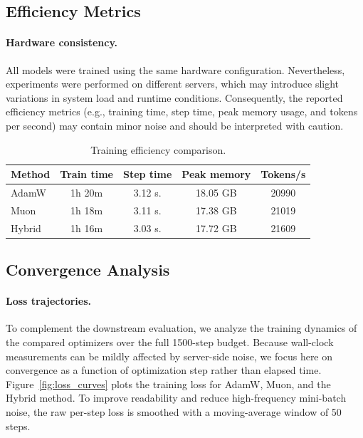 \documentclass[11pt,a4paper]{article}
\begin{document}
\subsection{Efficiency Metrics}

\paragraph{Hardware consistency.}
All models were trained using the same hardware configuration.
Nevertheless, experiments were performed on different servers, which may
introduce slight variations in system load and runtime conditions.
Consequently, the reported efficiency metrics (e.g., training time, step time,
peak memory usage, and tokens per second) may contain minor noise and should
be interpreted with caution.

\begin{table}[H]
	\centering
	\caption{Training efficiency comparison.}
	\begin{tabular}{lcccc}
		\toprule
		\textbf{Method} & \textbf{Train time} & \textbf{Step time} & \textbf{Peak memory} & \textbf{Tokens/s} \\
		\midrule
		AdamW           & 1h 20m              & 3.12 s.            & 18.05 GB             & 20990             \\
		Muon            & 1h 18m              & 3.11 s.            & 17.38 GB             & 21019             \\
		Hybrid          & 1h 16m              & 3.03 s.            & 17.72 GB             & 21609             \\
		\bottomrule
	\end{tabular}
\end{table}

\subsection{Convergence Analysis}

\paragraph{Loss trajectories.}
To complement the downstream evaluation, we analyze the training dynamics of
the compared optimizers over the full 1500-step budget. Because wall-clock
measurements can be mildly affected by server-side noise, we focus here on
convergence as a function of optimization step rather than elapsed time.
Figure~\ref{fig:loss_curves} plots the training loss for AdamW, Muon, and the
Hybrid method. To improve readability and reduce high-frequency
mini-batch noise, the raw per-step loss is smoothed with a moving-average
window of 50 steps.
\end{document}
